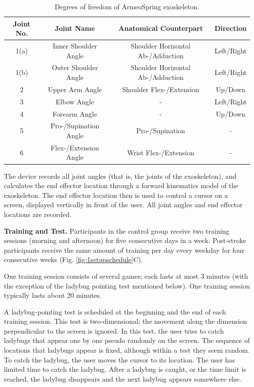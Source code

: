 \begin{table}
	\begin{tabular}{c c c c}
		\hline
		Joint No. & Joint Name & Anatomical Counterpart & Direction \\
		\hline
		1(a) & Inner Shoulder Angle & Shoulder Horizontal Ab-/Adduction & Left/Right \\
		1(b) & Outer Shoulder Angle & Shoulder Horizontal Ab-/Adduction & Left/Right \\
		2 & Upper Arm Angle & Shoulder Flex-/Extension & Up/Down \\
		3 & Elbow Angle & - & Left/Right \\
		4 & Forearm Angle & - & Up/Down \\
		5 & Pro-/Supination Angle & Pro-/Supination & - \\ 
		6 & Flex-/Extension Angle & Wrist Flex-/Extension & - \\
		\hline
	\end{tabular}
	\caption{Degrees of freedom of ArmeoSpring exoskeleton.}
	\label{tab:devicedof}
\end{table}

The device records all joint angles (that is, the joints of the exoskeleton), and calculates the end effector location through a forward kinematics model of the exoskeleton. 
The end effector location then is used to control a cursor on a screen, displayed vertically in front of the user. 
All joint angles and end effector locations are recorded.

\textbf{Training and Test.}
Participants in the control group receive two training sessions (morning and afternoon) for five consecutive days in a week.
Post-stroke participants receive the same amount of training per day every weekday for four consecutive weeks (Fig. \ref{fig:1setupschedule}C).

One training session consists of several games; each lasts at most 3 minutes (with the exception of the ladybug pointing test mentioned below).
One training session typically lasts about 20 minutes.

A ladybug-pointing test is scheduled at the beginning and the end of each training session. 
This test is two-dimensional; the movement along the dimension perpendicular to the screen is ignored. 
In this test, the user tries to catch ladybugs that appear one by one pseudo randomly on the screen. 
The sequence of locations that ladybugs appear is fixed, although within a test they seem random.
To catch the ladybug, the user moves the cursor to its location. 
The user has limited time to catch the ladybug.
After a ladybug is caught, or the time limit is reached, the ladybug disappears and the next ladybug appears somewhere else. 


